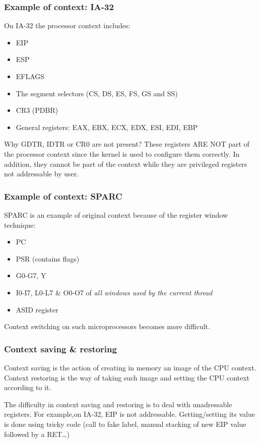 
\begin{frame}
  \frametitle{Example of context: IA-32}

  On IA-32 the processor context includes:

  \begin{itemize}
  \item
    EIP
  \item
    ESP
  \item
    EFLAGS
  \item
    The segment selectors (CS, DS, ES, FS, GS and SS)
  \item
    CR3 (PDBR)
  \item
    General registers: EAX, EBX, ECX, EDX, ESI, EDI, EBP
  \end{itemize}

  \-

  Why GDTR, IDTR or CR0 are not present? These registers ARE NOT part
  of the processor context since the kernel is used to configure them
  correctly. In addition, they cannot be part of the context while
  they are privileged registers not addressable by user.

\end{frame}


\begin{frame}
  \frametitle{Example of context: SPARC}

  SPARC is an example of original context because of the register
  window technique:

  \begin{itemize}
  \item
    PC
  \item
    PSR (contains flags)
  \item
    G0-G7, Y
  \item
    I0-I7, L0-L7 \& O0-O7 of \emph{all windows used by the current thread}
  \item
    ASID register
  \end{itemize}

  \-

  Context switching on such microprocessors becomes more difficult.

\end{frame}


\begin{frame}
  \frametitle{Context saving \& restoring}

  Context saving is the action of creating in memory an image of the
  CPU context. Context restoring is the way of taking such image and
  setting the CPU context according to it.

  \-

  The difficulty in context saving and restoring is to deal with
  unadressable registers. For example,on IA-32, EIP is not
  addressable. Getting/setting its value is done using tricky code
  (call to fake label, manual stacking of new EIP value followed by a
  RET\ldots)

\end{frame}

